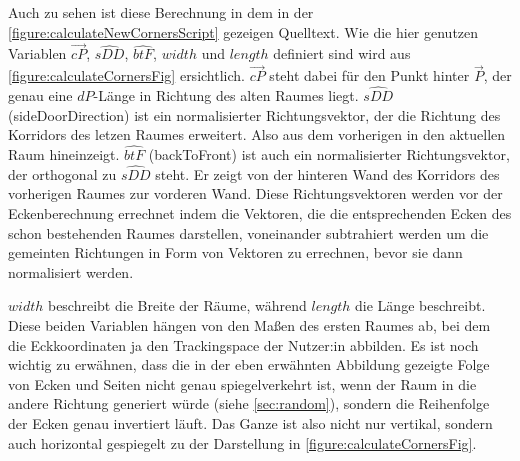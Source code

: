 Auch zu sehen ist diese Berechnung in dem in der \autoref{figure:calculateNewCornersScript} gezeigen Quelltext.
Wie die hier genutzen Variablen $\vec{cP}$, $\hat{sDD}$, $\hat{btF}$, $width$ und $length$ definiert sind wird aus \autoref{figure:calculateCornersFig} ersichtlich. %
$\vec{cP}$ steht dabei für den Punkt hinter $\vec{P}$, der genau eine $dP$-Länge in Richtung des alten Raumes liegt. $\hat{sDD}$ (sideDoorDirection) ist ein normalisierter Richtungsvektor,
der die Richtung des Korridors des letzen Raumes erweitert. %
Also aus dem vorherigen in den aktuellen Raum hineinzeigt.
$\hat{btF}$ (backToFront) ist auch ein normalisierter Richtungsvektor, der orthogonal zu $\hat{sDD}$ steht.
Er zeigt von der hinteren Wand des Korridors des vorherigen Raumes zur vorderen Wand.
Diese Richtungsvektoren werden vor der Eckenberechnung errechnet indem die Vektoren, die die entsprechenden Ecken des schon bestehenden Raumes darstellen, voneinander subtrahiert werden um die gemeinten Richtungen in Form von Vektoren zu errechnen, bevor sie dann normalisiert werden.

$width$ beschreibt die Breite der Räume, während $length$ die Länge beschreibt. Diese beiden Variablen hängen von den Maßen des ersten Raumes ab, bei dem die Eckkoordinaten ja den Trackingspace der Nutzer:in abbilden. Es ist noch wichtig zu erwähnen, dass die in der eben erwähnten Abbildung gezeigte Folge von Ecken und Seiten nicht genau spiegelverkehrt ist, wenn der Raum in die andere Richtung generiert würde (siehe \autoref{sec:random}), sondern die Reihenfolge der Ecken genau invertiert läuft. Das Ganze ist also nicht nur vertikal, sondern auch horizontal gespiegelt zu der Darstellung in \autoref{figure:calculateCornersFig}.

